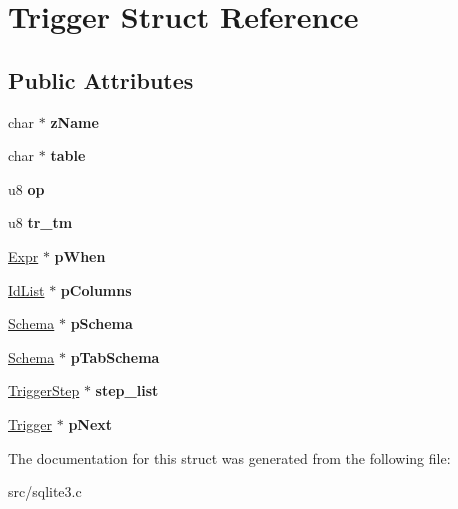\hypertarget{struct_trigger}{\section{Trigger Struct Reference}
\label{struct_trigger}
}
\subsection*{Public Attributes}
\begin{DoxyCompactItemize}
\item 
\hypertarget{struct_trigger_a9aecea5dadd7ae93b7f585c4b914791c}{char $\ast$ {\bfseries z\-Name}}\label{struct_trigger_a9aecea5dadd7ae93b7f585c4b914791c}

\item 
\hypertarget{struct_trigger_ab9d5500f7fc43382e867733a2968ecae}{char $\ast$ {\bfseries table}}\label{struct_trigger_ab9d5500f7fc43382e867733a2968ecae}

\item 
\hypertarget{struct_trigger_a855d6b6a302d8d80e1d30ddd70fd403e}{u8 {\bfseries op}}\label{struct_trigger_a855d6b6a302d8d80e1d30ddd70fd403e}

\item 
\hypertarget{struct_trigger_af0d10da140b068bfd76aaeb6607fa6cf}{u8 {\bfseries tr\-\_\-tm}}\label{struct_trigger_af0d10da140b068bfd76aaeb6607fa6cf}

\item 
\hypertarget{struct_trigger_a1b6cdd46e8b98562920d1acee86281ed}{\hyperlink{struct_expr}{Expr} $\ast$ {\bfseries p\-When}}\label{struct_trigger_a1b6cdd46e8b98562920d1acee86281ed}

\item 
\hypertarget{struct_trigger_a8505fbdf63ca9eadf4b2585e99faa4e4}{\hyperlink{struct_id_list}{Id\-List} $\ast$ {\bfseries p\-Columns}}\label{struct_trigger_a8505fbdf63ca9eadf4b2585e99faa4e4}

\item 
\hypertarget{struct_trigger_a83edbfa91ce6520a6ebc1a21acc2cd5e}{\hyperlink{struct_schema}{Schema} $\ast$ {\bfseries p\-Schema}}\label{struct_trigger_a83edbfa91ce6520a6ebc1a21acc2cd5e}

\item 
\hypertarget{struct_trigger_a8e4a9b3f4bcc5c645e1777b3bb94a6d8}{\hyperlink{struct_schema}{Schema} $\ast$ {\bfseries p\-Tab\-Schema}}\label{struct_trigger_a8e4a9b3f4bcc5c645e1777b3bb94a6d8}

\item 
\hypertarget{struct_trigger_a4206faaae6cdf1a2b22a2c9f15c88642}{\hyperlink{struct_trigger_step}{Trigger\-Step} $\ast$ {\bfseries step\-\_\-list}}\label{struct_trigger_a4206faaae6cdf1a2b22a2c9f15c88642}

\item 
\hypertarget{struct_trigger_ac28107e1c45789e0146fe45867b8dfdb}{\hyperlink{struct_trigger}{Trigger} $\ast$ {\bfseries p\-Next}}\label{struct_trigger_ac28107e1c45789e0146fe45867b8dfdb}

\end{DoxyCompactItemize}


The documentation for this struct was generated from the following file\-:\begin{DoxyCompactItemize}
\item 
src/sqlite3.\-c\end{DoxyCompactItemize}
